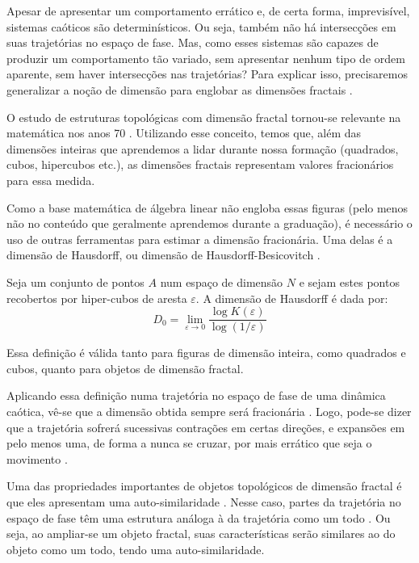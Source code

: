 \documentclass[a4paper, 12pt]{article}
\begin{document}
Apesar de apresentar um comportamento errático e, de certa forma, imprevisível, sistemas caóticos são determinísticos. Ou seja, também não há intersecções em suas trajetórias no espaço de fase. Mas, como esses sistemas são capazes de produzir um comportamento tão variado, sem apresentar nenhum tipo de ordem aparente, sem haver intersecções nas trajetórias? Para explicar isso, precisaremos generalizar a noção de dimensão para englobar as dimensões fractais \cite{mandelbrot1967long}. 

O estudo de estruturas topológicas com dimensão fractal tornou-se relevante na matemática nos anos 70 \cite{gleick1998chaos}. Utilizando esse conceito, temos que, além das dimensões inteiras que aprendemos a lidar durante nossa formação (quadrados, cubos, hipercubos etc.), as dimensões fractais representam valores fracionários para essa medida.

Como a base matemática de álgebra linear não engloba essas figuras (pelo menos não no conteúdo que geralmente aprendemos durante a graduação), é necessário o uso de outras ferramentas para estimar a dimensão fracionária. Uma delas é a dimensão de Hausdorff, ou dimensão de Hausdorff-Besicovitch \cite{attux2001dinamica, fiedler1994caos}.

Seja um conjunto de pontos $A$ num espaço de dimensão $N$ e sejam estes pontos recobertos por hiper-cubos de aresta $\varepsilon$. A dimensão de Hausdorff é dada por:
\begin{equation}
D_0 = \lim_{\varepsilon \rightarrow 0} \frac{\log K (\varepsilon)}{\log (1/\varepsilon)}
\end{equation}

Essa definição é válida tanto para figuras de dimensão inteira, como quadrados e cubos, quanto para objetos de dimensão fractal.

Aplicando essa definição numa trajetória no espaço de fase de uma dinâmica caótica, vê-se que a dimensão obtida sempre será fracionária \cite{fiedler1994caos}. Logo, pode-se dizer que a trajetória sofrerá sucessivas contrações em certas direções, e expansões em pelo menos uma, de forma a nunca se cruzar, por mais errático que seja o movimento \cite{fiedler1994caos}.

Uma das propriedades importantes de objetos topológicos de dimensão fractal é que eles apresentam uma auto-similaridade \cite{gleick1998chaos}. Nesse caso, partes da trajetória no espaço de fase têm uma estrutura análoga à da trajetória como um todo \cite{attux2001dinamica}. Ou seja, ao ampliar-se um objeto fractal, suas características serão similares ao do objeto como um todo, tendo uma auto-similaridade.
\end{document}
